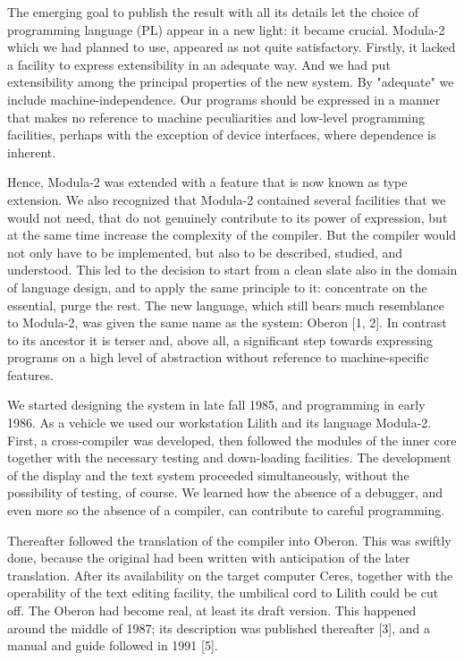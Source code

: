The emerging goal to publish the result with all its details let the choice of programming language (PL)
appear in a new light: it became crucial. Modula-2 which we had planned to use, appeared as not
quite satisfactory. Firstly, it lacked a facility to express extensibility in an adequate way. And we had
put extensibility among the principal properties of the new system. By "adequate" we include
machine-independence. Our programs should be expressed in a manner that makes no reference
to machine peculiarities and low-level programming facilities, perhaps with the exception of device
interfaces, where dependence is inherent.

Hence, Modula-2 was extended with a feature that is now known as type extension. We also
recognized that Modula-2 contained several facilities that we would not need, that do not genuinely
contribute to its power of expression, but at the same time increase the complexity of the compiler.
But the compiler would not only have to be implemented, but also to be described, studied, and
understood. This led to the decision to start from a clean slate also in the domain of language
design, and to apply the same principle to it: concentrate on the essential, purge the rest. The new
language, which still bears much resemblance to Modula-2, was given the same name as the
system: Oberon [1, 2]. In contrast to its ancestor it is terser and, above all, a significant step
towards expressing programs on a high level of abstraction without reference to machine-specific
features.

We started designing the system in late fall 1985, and programming in early 1986. As a vehicle we
used our workstation Lilith and its language Modula-2. First, a cross-compiler was developed, then
followed the modules of the inner core together with the necessary testing and down-loading
facilities. The development of the display and the text system proceeded simultaneously, without
the possibility of testing, of course. We learned how the absence of a debugger, and even more so
the absence of a compiler, can contribute to careful programming.

Thereafter followed the translation of the compiler into Oberon. This was swiftly done, because the
original had been written with anticipation of the later translation. After its availability on the target
computer Ceres, together with the operability of the text editing facility, the umbilical cord to Lilith
could be cut off. The Oberon had become real, at least its draft version. This happened
around the middle of 1987; its description was published thereafter [3], and a manual and guide
followed in 1991 [5].

